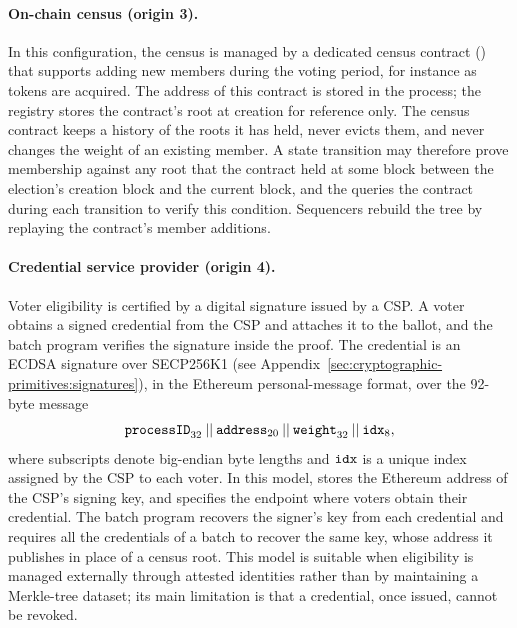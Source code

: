 \paragraph{On-chain census (origin 3).} In this configuration, the census is managed by a dedicated census contract (\hlget{\censusvalidator}) that supports adding new members during the voting period, for instance as tokens are acquired. The address of this contract is stored in the process; the registry stores the contract's root at creation for reference only. The census contract keeps a history of the roots it has held, never evicts them, and never changes the weight of an existing member. A state transition may therefore prove membership against any root that the contract held at some block between the election's creation block and the current block, and the \hlget{\processregistry} queries the contract during each transition to verify this condition. Sequencers rebuild the tree by replaying the contract's member additions.

\paragraph{Credential service provider (origin 4).} Voter eligibility is certified by a digital signature issued by a \ac{CSP}. A voter obtains a signed credential from the \ac{CSP} and attaches it to the ballot, and the batch program verifies the signature inside the proof. The credential is an ECDSA signature over SECP256K1 (see Appendix~\ref{sec:cryptographic-primitives:signatures}), in the Ethereum personal-message format, over the 92-byte message
\begin{equation}
	\texttt{processID}_{\text{32}} \:||\: \texttt{address}_{\text{20}} \:||\: \texttt{weight}_{\text{32}} \:||\: \texttt{idx}_{\text{8}},
	\label{eq:csp-message}
\end{equation}
where subscripts denote big-endian byte lengths and $\texttt{idx}$ is a unique index assigned by the \ac{CSP} to each voter. In this model, \censusroot stores the Ethereum address of the \ac{CSP}'s signing key, and \censusuri specifies the endpoint where voters obtain their credential. The batch program recovers the signer's key from each credential and requires all the credentials of a batch to recover the same key, whose address it publishes in place of a census root. This model is suitable when eligibility is managed externally through attested identities rather than by maintaining a Merkle-tree dataset; its main limitation is that a credential, once issued, cannot be revoked.

